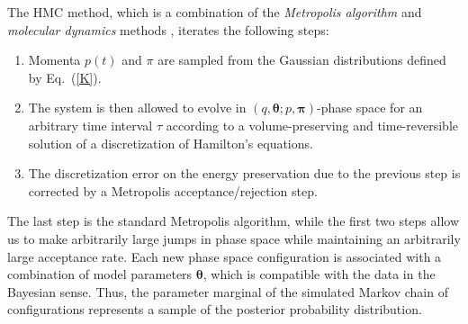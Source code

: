 \documentclass[12pt,a4paper,final]{iopart}
\newcommand{\bt}{\pmb\theta}
\begin{document}
The HMC method, which is a combination of the {\em Metropolis algorithm} \cite{metropolis_1953} and {\em molecular dynamics} methods \cite{alder_1959_MD, rahman_1964_MD}, iterates the following steps:
\begin{enumerate}
  \item
  Momenta $p(t)$ and $\pi$ are sampled from the Gaussian distributions defined by Eq.~(\ref{K}).
  \item
  The system is then allowed to evolve in $\left(q,\bt; p,{\pmb\pi}\right)$-phase space for an arbitrary time interval $\tau$ according to a volume-preserving and time-reversible solution of a discretization of Hamilton's equations.
  \item
  The discretization error on the energy preservation due to the previous step is corrected by a Metropolis acceptance/rejection step.
\end{enumerate}
The last step is the standard Metropolis algorithm, while the first two steps allow us to make arbitrarily large jumps in phase space while maintaining an arbitrarily large acceptance rate. Each new phase space configuration is associated with a combination of model parameters $\bt$, which is compatible with the data in the Bayesian sense. Thus, the parameter marginal of the simulated Markov chain of configurations represents a sample of the posterior probability distribution.
\end{document}
